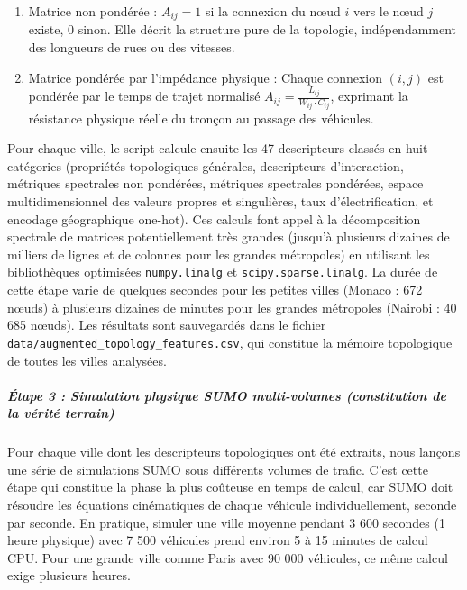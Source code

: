 \documentclass[10pt, a4paper]{article}
\providecommand{\tightlist}{}
\begin{document}
\begin{enumerate}
\def\labelenumi{\arabic{enumi}.}
\tightlist
\item
  Matrice non pondérée : \(A_{ij} = 1\) si la connexion du nœud \(i\)
  vers le nœud \(j\) existe, \(0\) sinon. Elle décrit la structure pure
  de la topologie, indépendamment des longueurs de rues ou des vitesses.
\item
  Matrice pondérée par l'impédance physique : Chaque connexion
  \((i, j)\) est pondérée par le temps de trajet normalisé
  \(A_{ij} = \frac{L_{ij}}{W_{ij} \cdot C_{ij}}\), exprimant la
  résistance physique réelle du tronçon au passage des véhicules.
\end{enumerate}

Pour chaque ville, le script calcule ensuite les 47 descripteurs classés
en huit catégories (propriétés topologiques générales, descripteurs
d'interaction, métriques spectrales non pondérées, métriques spectrales
pondérées, espace multidimensionnel des valeurs propres et singulières,
taux d'électrification, et encodage géographique one-hot). Ces calculs
font appel à la décomposition spectrale de matrices potentiellement très
grandes (jusqu'à plusieurs dizaines de milliers de lignes et de colonnes
pour les grandes métropoles) en utilisant les bibliothèques optimisées
\texttt{numpy.linalg} et \texttt{scipy.sparse.linalg}. La durée de cette
étape varie de quelques secondes pour les petites villes (Monaco : 672
nœuds) à plusieurs dizaines de minutes pour les grandes métropoles
(Nairobi : 40 685 nœuds). Les résultats sont sauvegardés dans le fichier
\texttt{data/augmented\_topology\_features.csv}, qui constitue la
mémoire topologique de toutes les villes analysées.

\subparagraph{Étape 3 : Simulation physique SUMO multi-volumes
(constitution de la vérité
terrain)}\label{uxe9tape-3-simulation-physique-sumo-multi-volumes-constitution-de-la-vuxe9rituxe9-terrain}

Pour chaque ville dont les descripteurs topologiques ont été extraits,
nous lançons une série de simulations SUMO sous différents volumes de
trafic. C'est cette étape qui constitue la phase la plus coûteuse en
temps de calcul, car SUMO doit résoudre les équations cinématiques de
chaque véhicule individuellement, seconde par seconde. En pratique,
simuler une ville moyenne pendant 3 600 secondes (1 heure physique) avec
7 500 véhicules prend environ 5 à 15 minutes de calcul CPU. Pour une
grande ville comme Paris avec 90 000 véhicules, ce même calcul exige
plusieurs heures.
\end{document}
